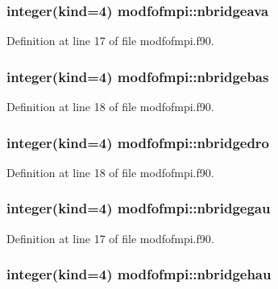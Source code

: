 \hypertarget{classmodfofmpi_a2ce30cec8604582ad8aaa26ef19b41cb}{
\subsubsection[{nbridgeava}]{\setlength{\rightskip}{0pt plus 5cm}integer(kind=4) modfofmpi\-::nbridgeava}}\label{classmodfofmpi_a2ce30cec8604582ad8aaa26ef19b41cb}


Definition at line 17 of file modfofmpi.\-f90.

\hypertarget{classmodfofmpi_ad71e96722537b8de69afdb8f68028e8b}{
\subsubsection[{nbridgebas}]{\setlength{\rightskip}{0pt plus 5cm}integer(kind=4) modfofmpi\-::nbridgebas}}\label{classmodfofmpi_ad71e96722537b8de69afdb8f68028e8b}


Definition at line 18 of file modfofmpi.\-f90.

\hypertarget{classmodfofmpi_a0253e42a34623e4816f27522252d1e29}{
\subsubsection[{nbridgedro}]{\setlength{\rightskip}{0pt plus 5cm}integer(kind=4) modfofmpi\-::nbridgedro}}\label{classmodfofmpi_a0253e42a34623e4816f27522252d1e29}


Definition at line 18 of file modfofmpi.\-f90.

\hypertarget{classmodfofmpi_a000b4f4f0140c24648780b86d56698cf}{
\subsubsection[{nbridgegau}]{\setlength{\rightskip}{0pt plus 5cm}integer(kind=4) modfofmpi\-::nbridgegau}}\label{classmodfofmpi_a000b4f4f0140c24648780b86d56698cf}


Definition at line 17 of file modfofmpi.\-f90.

\hypertarget{classmodfofmpi_a81ecc186519e9addf2dbf7ec92e32d23}{
\subsubsection[{nbridgehau}]{\setlength{\rightskip}{0pt plus 5cm}integer(kind=4) modfofmpi\-::nbridgehau}}\label{classmodfofmpi_a81ecc186519e9addf2dbf7ec92e32d23}


